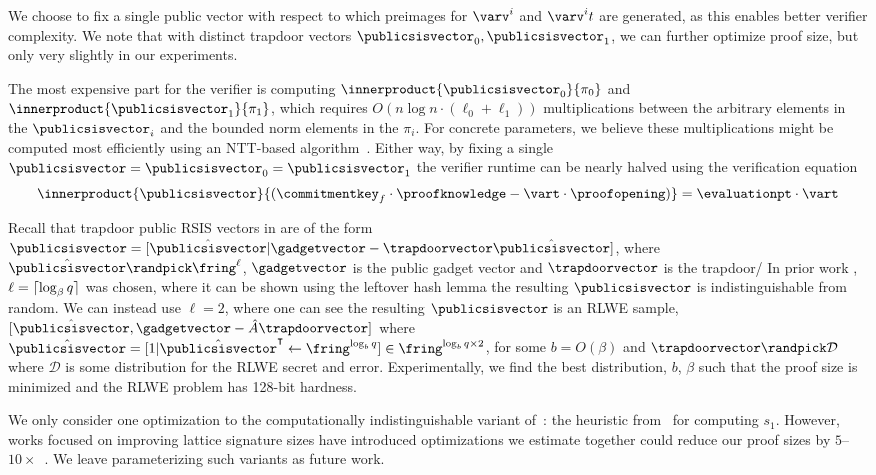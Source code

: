 We choose to fix a single public \rsis vector \publicsisvector with respect to which preimages for $\varv^i$ and $\varv^i t$ are generated, as this enables better verifier complexity. We note that with distinct trapdoor \sis vectors $\publicsisvector_0, \publicsisvector_1$, we can further optimize proof size, but only very slightly in our experiments.

The most expensive part for the verifier is computing $\innerproduct{\publicsisvector_0}{\pi_0}$ and $\innerproduct{\publicsisvector_1}{\pi_1}$, which requires $O(n \log n \cdot (\ell_0+\ell_1))$ multiplications between the arbitrary \fring elements in the $\publicsisvector_i$ and the bounded norm elements in the $\pi_i$. For concrete parameters, we believe these multiplications might be computed most efficiently using an NTT-based algorithm~\cite{bhkpy22}. Either way, by fixing a single $\publicsisvector = \publicsisvector_0 = \publicsisvector_1$ the verifier runtime can be nearly halved using the verification equation
\[
\innerproduct{\publicsisvector}{(\commitmentkey_{f} \cdot \proofknowledge - \vart \cdot \proofopening)} = \evaluationpt\cdot\vart
\]

Recall that trapdoor public RSIS vectors in \cite{EC:MicPei12} are of the form $\publicsisvector = [\hat{\publicsisvector}|\gadgetvector - \trapdoorvector\hat{\publicsisvector}]$, where $\hat{\publicsisvector} \randpick \fring^\ell$, $\gadgetvector$ is the public gadget vector and $\trapdoorvector$ is the trapdoor/ In prior work \cite{C:ACLMT22}, $\ell = \lceil\log_\beta{q}\rceil$ was chosen, where it can be shown using the leftover hash lemma the resulting $\publicsisvector$ is indistinguishable from random.  We can instead use $\ell = 2$, where one can see the resulting $\publicsisvector$ is an RLWE sample, $[\hat{\publicsisvector}, \gadgetvector - \hat{A}\trapdoorvector]$ where $\hat{\publicsisvector} = [1 | \hat{\publicsisvector}^\intercal \gets \fring^{\log_b{q}}] \in \fring^{\log_b{q} \times 2}$, for some $b = O(\beta)$ and $\trapdoorvector \randpick \mathcal{D}$ where $\mathcal{D}$ is some distribution for the RLWE secret and error.  Experimentally, we find the best distribution, $b$, $\beta$ such that the proof size is minimized and the RLWE problem has 128-bit hardness.

We only consider one optimization to the computationally indistinguishable variant of~\cite{EC:MicPei12}: the heuristic from~\cite{gmpw20} for computing $s_1$. However, works focused on improving lattice signature sizes have introduced optimizations we estimate together could reduce our proof sizes by $5$--$10\times$~\cite{cgm19,dsh21,jht22}. We leave parameterizing such variants as future work.


